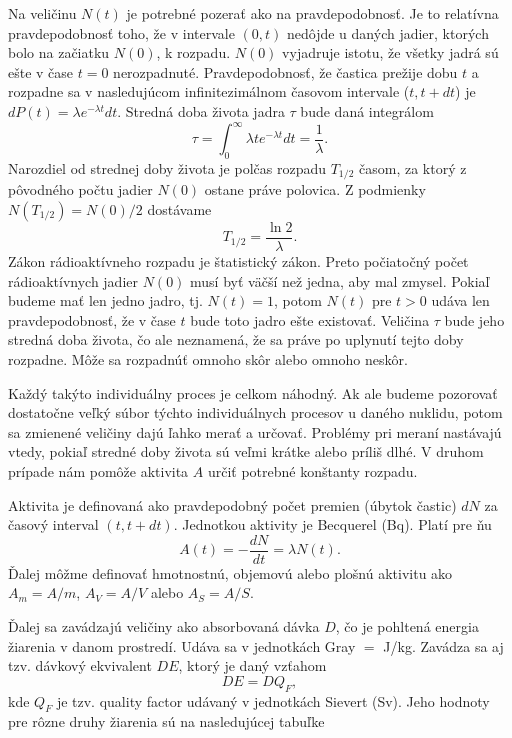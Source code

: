 \documentclass[../../main.tex]{subfiles}
\begin{document}
Na veličinu $N(t)$ je potrebné pozerať ako na pravdepodobnosť. Je to relatívna pravdepodobnosť toho, že v intervale $(0,t)$ nedôjde u daných jadier, ktorých bolo na začiatku $N(0)$, k rozpadu. $N(0)$ vyjadruje istotu, že všetky jadrá sú ešte v čase $t=0$ nerozpadnuté. Pravdepodobnosť, že častica prežije dobu $t$ a rozpadne sa v nasledujúcom infinitezimálnom časovom intervale ($t,t+dt$) je $dP(t)= \lambda e^{-\lambda t}dt$. Stredná doba života jadra $\tau$ bude daná integrálom
\begin{equation}
\tau = \int_0^{\infty} \lambda te^{-\lambda t}dt = \frac{1}{\lambda}.
\end{equation}
Narozdiel od strednej doby života je polčas rozpadu $T_{1/2}$ časom, za ktorý z pôvodného počtu jadier $N(0)$ ostane práve polovica. Z podmienky $N(T_{1/2}) = N(0)/2$ dostávame 
\begin{equation}
T_{1/2} = \frac{\ln2}{\lambda}.
\end{equation}
Zákon rádioaktívneho rozpadu je štatistický zákon. Preto počiatočný počet rádioaktívnych jadier $N(0)$ musí byť väčší než jedna, aby mal zmysel. Pokiaľ budeme mať len jedno jadro, tj. $N(t)=1$, potom $N(t)$ pre $t>0$ udáva len pravdepodobnosť, že v čase $t$ bude toto jadro ešte existovať. Veličina $\tau$ bude jeho stredná doba života, čo ale neznamená, že sa práve po uplynutí tejto doby rozpadne. Môže sa rozpadnúť omnoho skôr alebo omnoho neskôr.

Každý takýto individuálny proces je celkom náhodný. Ak ale budeme pozorovať dostatočne veľký súbor týchto individuálnych procesov u daného nuklidu, potom sa zmienené veličiny dajú ľahko merať a určovať. Problémy pri meraní nastávajú vtedy, pokiaľ stredné doby života sú veľmi krátke alebo príliš dlhé. V druhom prípade nám pomôže aktivita $A$ určiť potrebné konštanty rozpadu.

Aktivita je definovaná ako pravdepodobný počet premien (úbytok častic) $dN$ za časový interval $(t,t+dt)$. Jednotkou aktivity je Becquerel (Bq). Platí pre ňu
\begin{equation}
A(t) = -\frac{dN}{dt} = \lambda N(t). 
\end{equation}
Ďalej môžme definovať hmotnostnú, objemovú alebo plošnú aktivitu ako $A_m = A/m$, $A_V = A/V$ alebo $A_S = A/S$.
 
Ďalej sa zavádzajú veličiny ako absorbovaná dávka $D$, čo je pohltená energia žiarenia v danom prostredí. Udáva sa v jednotkách Gray $=$ J/kg. Zavádza sa aj tzv. dávkový ekvivalent $DE$, ktorý je daný vzťahom 
$$ DE = D Q_F,$$
kde $Q_F$ je tzv. quality factor udávaný v jednotkách Sievert (Sv). Jeho hodnoty pre rôzne druhy žiarenia sú na nasledujúcej tabuľke
\end{document}
